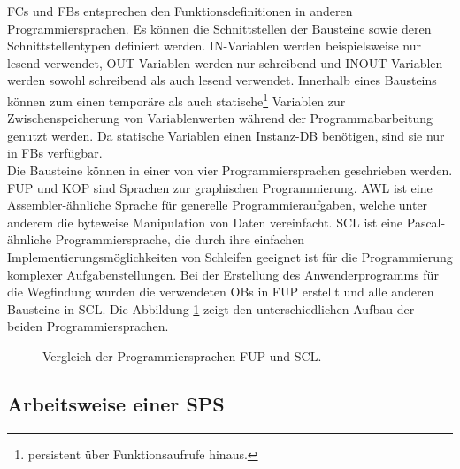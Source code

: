 			\ac{FC}s und \ac{FB}s entsprechen den Funktionsdefinitionen in anderen Programmiersprachen. Es können die Schnittstellen der Bausteine sowie deren Schnittstellentypen definiert werden. IN-Variablen werden beispielsweise nur lesend verwendet, OUT-Variablen werden nur schreibend und INOUT-Variablen werden sowohl schreibend als auch lesend verwendet. Innerhalb eines Bausteins können zum einen temporäre als auch statische\footnote{persistent über Funktionsaufrufe hinaus.} Variablen zur Zwischenspeicherung von Variablenwerten während der Programmabarbeitung genutzt werden. Da statische Variablen einen Instanz-\ac{DB} benötigen, sind sie nur in \ac{FB}s verfügbar.
			\\[4pt]
			Die Bausteine können in einer von vier Programmiersprachen geschrieben werden. \ac{FUP} und \ac{KOP} sind Sprachen zur graphischen Programmierung. \ac{AWL} ist eine Assembler-ähnliche Sprache für generelle Programmieraufgaben, welche unter anderem die byteweise Manipulation von Daten vereinfacht. \ac{SCL} ist eine Pascal-ähnliche Programmiersprache, die durch ihre einfachen Implementierungsmöglichkeiten von Schleifen geeignet ist für die Programmierung komplexer Aufgabenstellungen. Bei der Erstellung des Anwenderprogramms für die Wegfindung wurden die verwendeten \ac{OB}s in \ac{FUP} erstellt und alle anderen Bausteine in \ac{SCL}. Die Abbildung \ref{Vergleich FUPSCL} zeigt den unterschiedlichen Aufbau der beiden Programmiersprachen.
			
			\begin{figure}[h]
				\begin{center}
				\end{center}
				\caption{Vergleich der Programmiersprachen FUP und SCL.}\label{Vergleich FUPSCL}
			\end{figure}
			
	
		\subsection{Arbeitsweise einer SPS}
			

